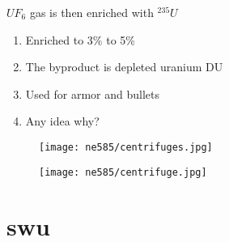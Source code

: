 \documentclass[aspectratio=1610,pdftex,dvipsnames,compress,xcolor={dvipsnames}]{beamer}
\newcommand{\acf}{\acrfull} %
\begin{document}
\addtocounter{framenumber}{-1} 
\begin{frame}{$UF_6$ gas is then enriched with $^{235}U$}
    \begin{enumerate}[series=outerlist,topsep=0pt,itemsep=21pt,leftmargin=*,label=(\arabic*)]
        \item[]Enriched to 3\% to 5\%
        \item[]The byproduct is depleted uranium DU
        \item[]Used for armor and bullets
        \item[]Any idea why?
    \end{enumerate}
\end{frame}


\begin{frame}{}
    \begin{figure}
        \centering
        \texttt{[image: ne585/centrifuges.jpg]}
    \end{figure}
\end{frame}


\begin{frame}{}
    \begin{figure}
        \centering
        \texttt{[image: ne585/centrifuge.jpg]}
    \end{figure}
\end{frame}


\section{\acf{swu}}
\end{document}
